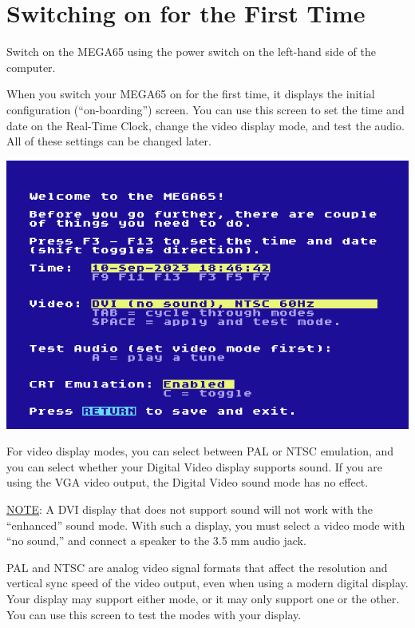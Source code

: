 \newpage

\section{Switching on for the First Time}
\label{onboarding}

Switch on the MEGA65 using the power switch on the left-hand side of the computer.

When you switch your MEGA65 on for the first time, it displays the initial configuration (``on-boarding'') screen. You can use this screen to set the time and date on the Real-Time Clock, change the video display mode, and test the audio. All of these settings can be changed later.

\begin{center}
  \includegraphics[width=0.7\linewidth]{images/img011_final_boot_01.png}
\end{center}

For video display modes, you can select between PAL or NTSC emulation, and you can select whether your Digital Video display supports sound. If you are using the VGA video output, the Digital Video sound mode has no effect.

\underline{NOTE}: A DVI display that does not support sound will not work with the ``enhanced'' sound mode. With such a display, you must select a video mode with ``no sound,'' and connect a speaker to the 3.5 mm audio jack.

PAL and NTSC are analog video signal formats that affect the resolution and vertical sync speed of the video output, even when using a modern digital display. Your display may support either mode, or it may only support one or the other. You can use this screen to test the modes with your display.

